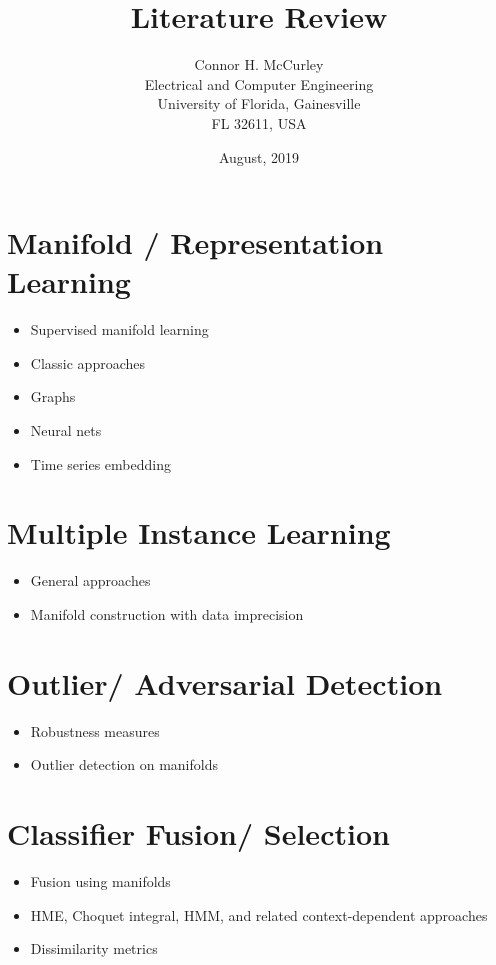 \documentclass{article}[10 pt]
\begin{document}
\title{Literature Review}
\date{August, 2019}
\author{Connor H. McCurley\\ Electrical and Computer Engineering\\ University of Florida, Gainesville\\FL 32611, USA}
\maketitle


\section{Manifold / Representation Learning}
    \begin{itemize}
        \item Supervised manifold learning
        \item Classic approaches
        \item Graphs
        \item Neural nets
        \item Time series embedding
    \end{itemize}

\section{Multiple Instance Learning}
    \begin{itemize}
        \item General approaches
        \item Manifold construction with data imprecision
    \end{itemize}

\section{Outlier/ Adversarial Detection}
    \begin{itemize}
        \item Robustness measures
        \item Outlier detection on manifolds
    \end{itemize}

\section{Classifier Fusion/ Selection}
    \begin{itemize}
        \item Fusion using manifolds
        \item HME, Choquet integral, HMM, and related context-dependent approaches
        \item Dissimilarity metrics
    \end{itemize}
\end{document}
